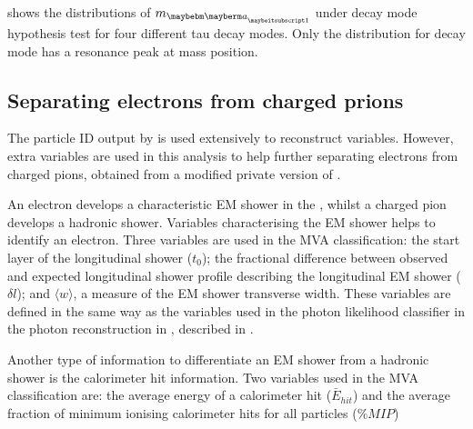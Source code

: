   shows the distributions of  $m_{\Pai}$ under \decayAiPhotonShort decay mode hypothesis test for four different tau decay modes. Only the distribution for \decayAiPhotonShort decay mode has a resonance peak at \Pai mass position.


\subsection{Separating electrons from charged prions}

The particle ID output by \pandora is used extensively to reconstruct variables. However, extra variables are used in this analysis to help further separating  electrons from charged pions, obtained from a modified private version of \pandora.



An electron develops a characteristic EM shower in the \ECAL, whilst a charged pion develops a hadronic shower. Variables characterising the  EM shower helps to identify an electron. Three variables are used in the MVA classification: the start layer of the longitudinal shower ($t_0$); the fractional difference between observed and expected longitudinal shower profile describing the longitudinal EM shower ($\delta{l}$); and $\langle{w}\rangle$, a measure of the EM shower transverse width. These variables are defined in the same way as the variables used in the photon likelihood classifier in the photon reconstruction in \pandora, described in .

Another type of information to differentiate an EM shower from a hadronic shower is the calorimeter hit information. Two variables used in the MVA classification are: the average energy of a calorimeter hit ($\bar{E}_{hit}$) and the average fraction of minimum ionising calorimeter hits for all particles ($\%MIP$)

